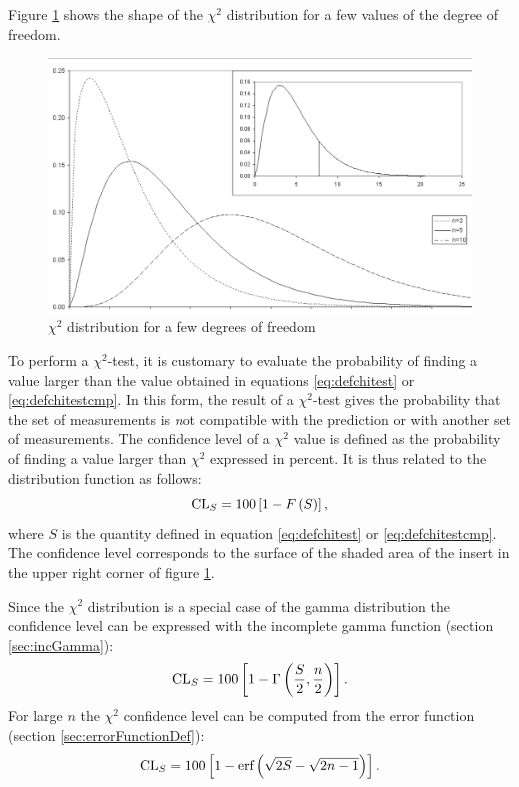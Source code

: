 Figure \ref{fig:chi2Distr} shows the shape of the $\chi^2$
distribution for a few values of the degree of freedom.
\begin{figure}
\centering\includegraphics[width=12cm]{Figures/Chi2Distribution}
\caption{$\chi^2$ distribution for a few degrees of freedom
}\label{fig:chi2Distr}
\end{figure}


To perform a $\chi^2$-test, it is customary to evaluate the
probability of finding a value larger than the value obtained in
equations \ref{eq:defchitest} or \ref{eq:defchitestcmp}. In this
form, the result of a $\chi^2$-test gives the probability that the
set of measurements is {\textsl not} compatible with the prediction or
with another set of measurements. The confidence level of a
$\chi^2$ value is defined as the probability of finding a value
larger than $\chi^2$ expressed in percent. It is thus related to
the distribution function as follows:
\begin{equation}
  {\mathop{\textrm{CL}}}_{S}=100\left[ 1-F\left(S\right)\right],
\end{equation}
where $S$ is the quantity defined in equation \ref{eq:defchitest}
or \ref{eq:defchitestcmp}. The confidence level corresponds to the
surface of the shaded area of the insert in the upper right corner
of figure \ref{fig:chi2Distr}.

Since the $\chi^2$ distribution is a special case of the gamma
distribution the confidence level can be expressed with the
incomplete gamma function (\cf section \ref{sec:incGamma}):
\begin{equation}
\label{eq:chiTest}
  {\mathop{\textrm{CL}}}_{S}=100\left[ 1-\Gamma\left({S \over 2},{n\over 2}\right)\right].
\end{equation}
For large $n$ the $\chi^2$ confidence level can be computed from
the error function (\cf section \ref{sec:errorFunctionDef}):
\begin{equation}
\label{eq:chiTestAsymp}
  {\mathop{\textrm{CL}}}_{S}=100\left[ 1-\mathop{\textrm{erf}}\left(\sqrt{2S}-\sqrt{2n-1}\right)\right].
\end{equation}


